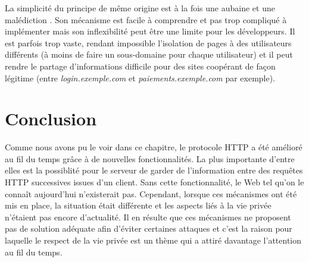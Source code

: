 La simplicité du principe de même origine est à la fois une aubaine et une malédiction \cite{zalewski2012tangled}. Son mécanisme est facile à comprendre et pas trop compliqué à implémenter mais son inflexibilité peut être une limite pour les développeurs. Il est parfois trop vaste, rendant impossible l'isolation de pages à des utilisateurs différents (à moins de faire un sous-domaine pour chaque utilisateur) et il peut rendre le partage d'informations difficile pour des sites coopérant de façon légitime (entre \textit{login.exemple.com} et \textit{paiements.exemple.com} par exemple).

\section{Conclusion}
Comme nous avons pu le voir dans ce chapitre, le protocole HTTP a été amélioré au fil du temps grâce à de nouvelles fonctionnalités. La plus importante d'entre elles est la possiblité pour le serveur de garder de l'information entre des requêtes HTTP successives issues d'un client. Sans cette fonctionnalité, le Web tel qu'on le connaît aujourd'hui n'existerait pas. Cependant, lorsque ces mécanismes ont été mis en place, la situation était différente et les aspects liés à la vie privée n'étaient pas encore d'actualité. Il en résulte que ces mécanismes ne proposent pas de solution adéquate afin d'éviter certaines attaques et c'est la raison pour laquelle le respect de la vie privée est un thème qui a attiré davantage l'attention au fil du temps.
